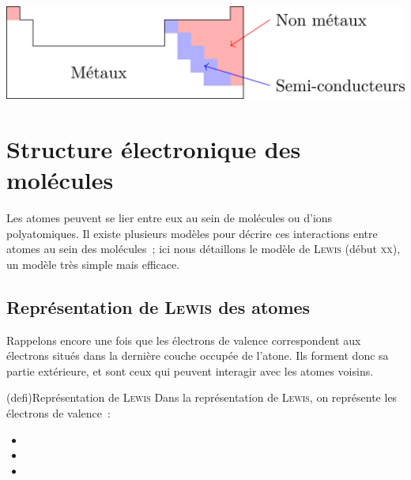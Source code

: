 \documentclass[../../main/main.tex]{subfiles}
\begin{document}
\begin{center}
	\includegraphics[scale=1]{metaux}
\end{center}

\section{Structure électronique des molécules}

Les atomes peuvent se lier entre eux au sein de molécules ou d'ions
polyatomiques. Il existe plusieurs modèles pour décrire ces
interactions entre atomes au sein des molécules~; ici nous détaillons le modèle
de \textsc{Lewis} (début \textsc{xx}\ieme), un modèle très simple mais efficace.

\subsection{Représentation de \textsc{Lewis} des atomes}
Rappelons encore une fois que les électrons de valence correspondent aux
électrons situés dans la dernière couche occupée de l'atone.
Ils forment donc sa partie extérieure, et sont ceux qui peuvent interagir avec
les atomes voisins.

\begin{tcb*}(defi){Représentation de \textsc{Lewis}}
	Dans la représentation de \textsc{Lewis}, on représente les électrons de
	valence~:
	\begin{itemize}
		\item {}
		\item {}
		\item {}
	\end{itemize}
\end{tcb*}
\end{document}
